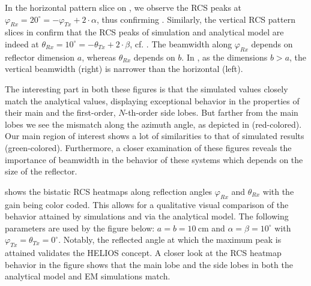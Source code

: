 In the horizontal pattern slice on , we observe the RCS peaks at $\varphi_{Rx} = 20^\circ = -\varphi_{Tx} + 2\cdot\alpha$, thus confirming . Similarly, the vertical RCS pattern slices in  confirm that the RCS peaks of simulation and analytical model are indeed at $\theta_{Rx} = 10^\circ = -\theta_{Tx} + 2\cdot\beta$, cf. . The beamwidth along $\varphi_{Rx}$ depends on reflector dimension $a$, whereas $\theta_{Rx}$ depends on $b$. In , as the dimensions $b >a$, the vertical beamwidth (right) is narrower than the horizontal (left).

The interesting part in both these figures is that the simulated values closely match the analytical values, displaying exceptional behavior in the properties of their main and the first-order, $N$-th-order side lobes. But farther from the main lobes we see the mismatch along the azimuth angle, as depicted in  (red-colored). Our main region of interest shows a lot of similarities to that of simulated results (green-colored). Furthermore, a closer examination of these figures reveals the importance of beamwidth in the behavior of these systems which depends on the size of the reflector.

 shows the bistatic RCS heatmaps along reflection angles $\varphi_{Rx}$ and $\theta_{Rx}$ with the gain being color coded. This allows for a qualitative visual comparison of the behavior attained by simulations and via the analytical model. The following parameters are used by the figure below: $a=b=\SI{10}{\centi\meter}$ and $\alpha=\beta=\num{10}^\circ$ with $\varphi_{Tx}=\theta_{Tx}=\num{0}^\circ$. Notably, the reflected angle at which the maximum peak is attained validates the HELIOS concept. A closer look at the RCS heatmap behavior in the figure shows that the main lobe and the side lobes in both the analytical model and EM simulations match.

